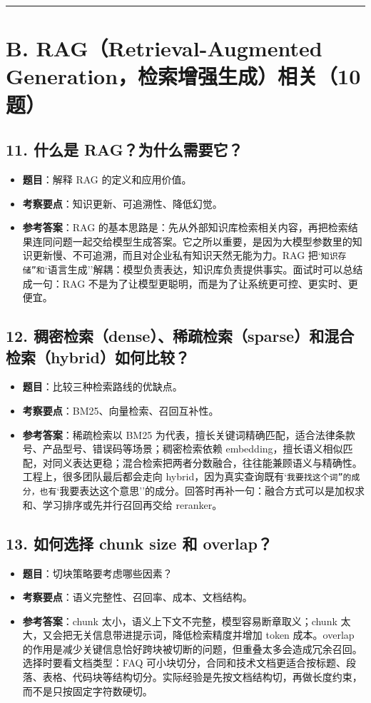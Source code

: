 \bigskip\hrule\bigskip

\section{B. RAG（Retrieval-Augmented Generation，检索增强生成）相关（10 题）}

\subsection{11. 什么是 RAG？为什么需要它？}
\begin{itemize}[leftmargin=2em]
\item \textbf{题目}：解释 RAG 的定义和应用价值。
\item \textbf{考察要点}：知识更新、可追溯性、降低幻觉。
\item \textbf{参考答案}：RAG 的基本思路是：先从外部知识库检索相关内容，再把检索结果连同问题一起交给模型生成答案。它之所以重要，是因为大模型参数里的知识更新慢、不可追溯，而且对企业私有知识天然无能为力。RAG 把`\texttt{知识存储''和}`语言生成''解耦：模型负责表达，知识库负责提供事实。面试时可以总结成一句：RAG 不是为了让模型更聪明，而是为了让系统更可控、更实时、更便宜。
\end{itemize}

\subsection{12. 稠密检索（dense）、稀疏检索（sparse）和混合检索（hybrid）如何比较？}
\begin{itemize}[leftmargin=2em]
\item \textbf{题目}：比较三种检索路线的优缺点。
\item \textbf{考察要点}：BM25、向量检索、召回互补性。
\item \textbf{参考答案}：稀疏检索以 BM25 为代表，擅长关键词精确匹配，适合法律条款号、产品型号、错误码等场景；稠密检索依赖 embedding，擅长语义相似匹配，对同义表达更稳；混合检索把两者分数融合，往往能兼顾语义与精确性。工程上，很多团队最后都会走向 hybrid，因为真实查询既有`\texttt{我要找这个词''的成分，也有}`我要表达这个意思''的成分。回答时再补一句：融合方式可以是加权求和、学习排序或先并行召回再交给 reranker。
\end{itemize}

\subsection{13. 如何选择 chunk size 和 overlap？}
\begin{itemize}[leftmargin=2em]
\item \textbf{题目}：切块策略要考虑哪些因素？
\item \textbf{考察要点}：语义完整性、召回率、成本、文档结构。
\item \textbf{参考答案}：chunk 太小，语义上下文不完整，模型容易断章取义；chunk 太大，又会把无关信息带进提示词，降低检索精度并增加 token 成本。overlap 的作用是减少关键信息恰好跨块被切断的问题，但重叠太多会造成冗余召回。选择时要看文档类型：FAQ 可小块切分，合同和技术文档更适合按标题、段落、表格、代码块等结构切分。实际经验是先按文档结构切，再做长度约束，而不是只按固定字符数硬切。
\end{itemize}


